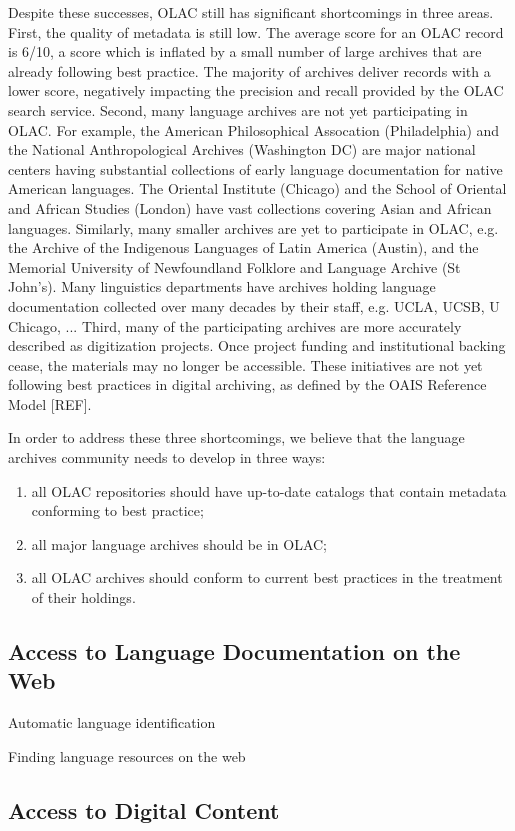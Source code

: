 Despite these successes, OLAC still has significant shortcomings in
three areas.
First, the quality of metadata is still low.  The average score for an
OLAC record is 6/10, a score which is inflated by a small number of
large archives that are already following best practice.  The majority
of archives deliver records with a lower score, negatively impacting
the precision and recall provided by the OLAC search service.
Second, many language archives are not yet participating in OLAC.  For
example, the American Philosophical Assocation (Philadelphia) and the
National Anthropological Archives (Washington DC) are major national
centers having substantial collections of early language documentation
for native American languages.  The Oriental Institute (Chicago) and
the School of Oriental and African Studies (London) have vast
collections covering Asian and African languages.  Similarly, many
smaller archives are yet to participate in OLAC, e.g. the
Archive of the Indigenous Languages of Latin America (Austin), and the
Memorial University of Newfoundland Folklore and Language Archive (St
John's).  Many linguistics departments have archives holding language
documentation collected over many decades by their staff, e.g. UCLA,
UCSB, U Chicago, ...
Third, many of the participating archives are more accurately described
as digitization projects.  Once project funding and institutional
backing cease, the materials may no longer be accessible.  These
initiatives are not yet following best practices in digital archiving,
as defined by the OAIS Reference Model [REF].


In order to address these three shortcomings, we believe that the
language archives community needs to develop in three ways:

\begin{enumerate}
\item all OLAC repositories should have up-to-date catalogs
      that contain metadata conforming to best practice;
\item all major language archives should be in OLAC;
\item all OLAC archives should conform to current best practices
      in the treatment of their holdings.
\end{enumerate}

\subsection{Access to Language Documentation on the Web}

Automatic language identification
\citep{HughesBaldwin06lrec}

Finding language resources on the web
\citep{BaldwinBird06}

\vspace{1in}

\subsection{Access to Digital Content}

\vspace{1in}

